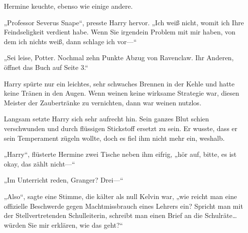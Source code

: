Hermine keuchte, ebenso wie einige andere.

„Professor Severus Snape“, presste Harry hervor. „Ich weiß nicht, womit ich Ihre Feindseligkeit verdient habe. Wenn Sie irgendein Problem mit mir haben, von dem ich nichts weiß, dann schlage ich vor—“

„Sei leise, Potter. Nochmal zehn Punkte Abzug von Ravenclaw. Ihr Anderen, öffnet das Buch auf Seite 3.“

Harry spürte nur ein leichtes, sehr schwaches Brennen in der Kehle und hatte keine Tränen in den Augen. Wenn weinen keine wirksame Strategie war, diesen Meister der Zaubertränke zu vernichten, dann war weinen nutzlos.

Langsam setzte Harry sich sehr aufrecht hin. Sein ganzes Blut schien verschwunden und durch flüssigen Stickstoff ersetzt zu sein. Er wusste, dass er sein Temperament zügeln wollte, doch es fiel ihm nicht mehr ein, weshalb.

„Harry“, flüsterte Hermine zwei Tische neben ihm eifrig, „hör auf, bitte, es ist okay, das zählt nicht—“

„Im Unterricht reden, Granger? Drei—“

„Also“, sagte eine Stimme, die kälter als null Kelvin war, „wie reicht man eine offizielle Beschwerde gegen Machtmissbrauch eines Lehrers ein? Spricht man mit der Stellvertretenden Schulleiterin, schreibt man einen Brief an die Schulräte…würden Sie mir erklären, wie das geht?“


